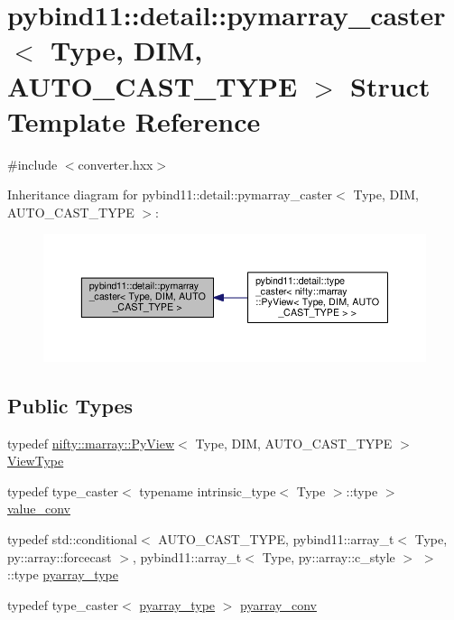 \hypertarget{structpybind11_1_1detail_1_1pymarray__caster}{}\section{pybind11\+:\+:detail\+:\+:pymarray\+\_\+caster$<$ Type, D\+I\+M, A\+U\+T\+O\+\_\+\+C\+A\+S\+T\+\_\+\+T\+Y\+P\+E $>$ Struct Template Reference}
\label{structpybind11_1_1detail_1_1pymarray__caster}


{\ttfamily \#include $<$converter.\+hxx$>$}



Inheritance diagram for pybind11\+:\+:detail\+:\+:pymarray\+\_\+caster$<$ Type, D\+I\+M, A\+U\+T\+O\+\_\+\+C\+A\+S\+T\+\_\+\+T\+Y\+P\+E $>$\+:\nopagebreak
\begin{figure}[H]
\begin{center}
\leavevmode
\includegraphics[width=350pt]{structpybind11_1_1detail_1_1pymarray__caster__inherit__graph}
\end{center}
\end{figure}
\subsection*{Public Types}
\begin{DoxyCompactItemize}
\item 
typedef \hyperlink{classnifty_1_1marray_1_1PyView}{nifty\+::marray\+::\+Py\+View}$<$ Type, D\+I\+M, A\+U\+T\+O\+\_\+\+C\+A\+S\+T\+\_\+\+T\+Y\+P\+E $>$ \hyperlink{structpybind11_1_1detail_1_1pymarray__caster_a0593b33c0ed08f1b25b34dbc3da1b01c}{View\+Type}
\item 
typedef type\+\_\+caster$<$ typename intrinsic\+\_\+type$<$ Type $>$\+::type $>$ \hyperlink{structpybind11_1_1detail_1_1pymarray__caster_aa57421c8e7e64ab62bac67897f864ea1}{value\+\_\+conv}
\item 
typedef std\+::conditional$<$ A\+U\+T\+O\+\_\+\+C\+A\+S\+T\+\_\+\+T\+Y\+P\+E, pybind11\+::array\+\_\+t$<$ Type, py\+::array\+::forcecast $>$, pybind11\+::array\+\_\+t$<$ Type, py\+::array\+::c\+\_\+style $>$ $>$\+::type \hyperlink{structpybind11_1_1detail_1_1pymarray__caster_a70ad611a7f6fd17d02b461c43dff6ea0}{pyarray\+\_\+type}
\item 
typedef type\+\_\+caster$<$ \hyperlink{structpybind11_1_1detail_1_1pymarray__caster_a70ad611a7f6fd17d02b461c43dff6ea0}{pyarray\+\_\+type} $>$ \hyperlink{structpybind11_1_1detail_1_1pymarray__caster_a0fe8ba6e31f03c24d130c0dba1a55fa8}{pyarray\+\_\+conv}
\end{DoxyCompactItemize}
